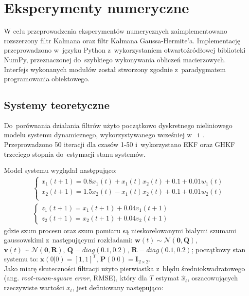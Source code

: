 \chapter{Eksperymenty numeryczne}
\label{cha:numerical_experiments}
W celu przeprowadzenia eksperymentów numerycznych zaimplementowano rozszerzony filtr Kalmana oraz filtr Kalmana Gaussa-Hermite'a. Implementację przeprowadzono w~języku Python z~wykorzystaniem otwartoźródłowej biblioteki NumPy, przeznaczonej do~szybkiego wykonywania obliczeń macierzowych. Interfejs wykonanych modułów został stworzony zgodnie z~paradygmatem programowania obiektowego. \par
\section{Systemy teoretyczne}
\label{sec:theoretical_systems}
Do~porównania działania filtrów użyto początkowo dyskretnego nieliniowego modelu systemu dynamicznego, wykorzystywanego wcześniej w~\cite{Liu} i~\cite{Germani}. Przeprowadzono 50 iteracji dla czasów 1-50 i~wykorzystano EKF oraz GHKF trzeciego stopnia do~estymacji stanu systemów.\par
Model systemu wyglądał następująco:
\begin{align}\label{eq:LiuModel1}
	&\left\{ 
	\begin{array}{l}
	x_1(t+1) = 0.8x_1(t) + x_1(t)x_2(t) + 0.1 + 0.01w_1(t) \\
	x_2(t+1) = 1.5x_2(t) - x_1(t)x_2(t) + 0.1 + 0.01w_2(t) \\
	\end{array}
	\right.\nonumber \\
	&\left\{ 
	\begin{array}{l}
	z_1(t+1) = x_1(t+1) + 0.04v_1(t+1) \\
	z_2(t+1) = x_2(t+1) + 0.04v_2(t+1)
	\end{array}
	\right.
\end{align}
gdzie szum procesu oraz szum pomiaru są nieskorelowanymi białymi szumami gaussowskimi z~następującymi rozkładami: $\boldsymbol{w}(t) \sim \mathcal{N}(\boldsymbol{0}, \boldsymbol{Q})$, $\boldsymbol{v}(t) \sim \mathcal{N}(\boldsymbol{0}, \boldsymbol{R})$, $\boldsymbol{Q}=diag(0.1, 0.2)$, $\boldsymbol{R}=diag(0.1, 0.2)$; początkowy stan systemu to: $\boldsymbol{x}(0|0) = [1,1]^T$, $\boldsymbol{P}(0|0) = \boldsymbol{I}_{2 \times 2}$.\\ 
Jako miarę skuteczności filtracji użyto pierwiastka z~błędu średniokwadratowego (ang. \textit{root-mean-square error}, RMSE), który dla $T$ estymat $\hat{x}_t$, oszacowujących rzeczywiste wartości $x_t$, jest definiowany następująco:
